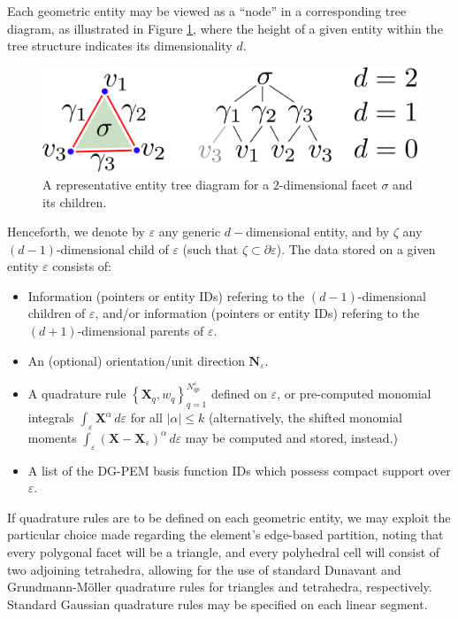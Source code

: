 	Each geometric entity may be viewed as a ``node'' in a corresponding tree diagram, as illustrated in Figure \ref{fig:entity_tree}, where the height of a given entity within the tree structure indicates its dimensionality $d$.
	\begin{figure} [!ht]
		\centering
		\includegraphics[width = 5.0in]{figures/entity_tree.pdf}
		\caption{A representative entity tree diagram for a $2$-dimensional facet $\sigma$ and its children.}
		\label{fig:entity_tree}
	\end{figure}
	
	Henceforth, we denote by $\varepsilon$ any generic $d-$dimensional entity, and by $\zeta$ any $(d-1)$-dimensional child of $\varepsilon$ (such that $\zeta \subset \partial \varepsilon$). The data stored on a given entity $\varepsilon$ consists of:
	\begin{itemize}
		\item Information (pointers or entity IDs) refering to the $(d-1)$-dimensional children of $\varepsilon$, and/or information (pointers or entity IDs) refering to the $(d+1)$-dimensional parents of $\varepsilon$.
		\item An (optional) orientation/unit direction $\mathbf{N}_\varepsilon$.
		\item A quadrature rule $\left\{ \mathbf{X}_q, w_q \right\}_{q=1}^{N^{\varepsilon}_{qp}}$ defined on $\varepsilon$, or pre-computed monomial integrals $\int_{\varepsilon} \mathbf{X}^\alpha \, d \varepsilon$ for all $|\alpha| \leq k$ (alternatively, the shifted monomial moments $\int_{\varepsilon} (\mathbf{X}-\mathbf{X}_{\varepsilon})^\alpha \, d \varepsilon$ may be computed and stored, instead.)
		\item A list of the DG-PEM basis function IDs which possess compact support over $\varepsilon$.
	\end{itemize}
	
	If quadrature rules are to be defined on each geometric entity, we may exploit the particular choice made regarding the element's edge-based partition, noting that every polygonal facet will be a triangle, and every polyhedral cell will consist of two adjoining tetrahedra, allowing for the use of standard Dunavant \cite{Dunavant:85} and Grundmann-M\"{o}ller \cite{Grundmann:78} quadrature rules for triangles and tetrahedra, respectively. Standard Gaussian quadrature rules may be specified on each linear segment.
	
